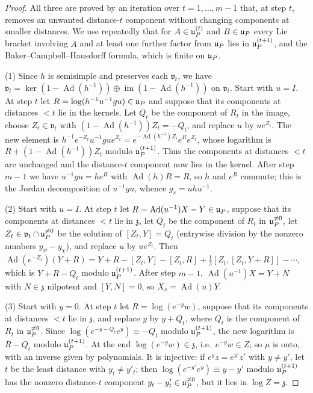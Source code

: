 \begin{proof}
All three are proved by an iteration over $t=1,\ldots,m-1$ that, at step $t$, removes an unwanted
distance-$t$ component without changing components at smaller distances. We use repeatedly that for
$A\in\mathfrak{u}_P^{(t)}$ and $B\in\mathfrak{u}_P$ every Lie bracket involving $A$ and at least one further factor
from $\mathfrak{u}_P$ lies in $\mathfrak{u}_P^{(t+1)}$, and the Baker--Campbell--Hausdorff formula, which is finite on
$\mathfrak{u}_P$.

(1) Since $h$ is semisimple and preserves each $\mathfrak v_t$, we have
$\mathfrak v_t=\ker(1-\operatorname{Ad}(h^{-1}))\oplus\operatorname{im}(1-\operatorname{Ad}(h^{-1}))$ on $\mathfrak v_t$. Start with $u=I$. At
step $t$ let $R=\log(h^{-1}u^{-1}gu)\in\mathfrak{u}_P$ and suppose that its components at distances $<t$ lie in
the kernels. Let $Q_t$ be the component of $R_t$ in the image, choose $Z_t\in\mathfrak v_t$ with
$(1-\operatorname{Ad}(h^{-1}))Z_t=-Q_t$, and replace $u$ by $ue^{Z_t}$. The new element is
$h^{-1}e^{-Z_t}u^{-1}gue^{Z_t}=e^{-\operatorname{Ad}(h^{-1})Z_t}e^{R}e^{Z_t}$, whose logarithm is
$R+(1-\operatorname{Ad}(h^{-1}))Z_t$ modulo $\mathfrak{u}_P^{(t+1)}$. Thus the components at distances $<t$ are
unchanged and the distance-$t$ component now lies in the kernel. After step $m-1$ we have
$u^{-1}gu=he^R$ with $\operatorname{Ad}(h)R=R$, so $h$ and $e^R$ commute; this is the Jordan decomposition of
$u^{-1}gu$, whence $g_s=uhu^{-1}$.

(2) Start with $u=I$. At step $t$ let $R=\operatorname{Ad}(u^{-1})X-Y\in\mathfrak{u}_P$, suppose that its components at
distances $<t$ lie in $\mathfrak z$, let $Q_t$ be the component of $R_t$ in $\mathfrak{u}_P^{\ne0}$, let
$Z_t\in\mathfrak v_t\cap\mathfrak{u}_P^{\ne0}$ be the solution of $[Z_t,Y]=Q_t$ (entrywise division by the nonzero
numbers $y_\psi-y_\chi$), and replace $u$ by $ue^{Z_t}$. Then
$\operatorname{Ad}(e^{-Z_t})(Y+R)=Y+R-[Z_t,Y]-[Z_t,R]+\tfrac12[Z_t,[Z_t,Y+R]]-\cdots$, which is
$Y+R-Q_t$ modulo $\mathfrak{u}_P^{(t+1)}$. After step $m-1$, $\operatorname{Ad}(u^{-1})X=Y+N$ with $N\in\mathfrak z$
nilpotent and $[Y,N]=0$, so $X_s=\operatorname{Ad}(u)Y$.

(3) Start with $y=0$. At step $t$ let $R=\log(e^{-y}w)$, suppose that its components at distances
$<t$ lie in $\mathfrak z$, and replace $y$ by $y+Q_t$, where $Q_t$ is the component of $R_t$ in
$\mathfrak{u}_P^{\ne0}$. Since $\log(e^{-y-Q_t}e^{y})\equiv-Q_t$ modulo $\mathfrak{u}_P^{(t+1)}$, the new logarithm is
$R-Q_t$ modulo $\mathfrak{u}_P^{(t+1)}$. At the end $\log(e^{-y}w)\in\mathfrak z$, i.e.\ $e^{-y}w\in Z$; so $\mu$
is onto, with an inverse given by polynomials. It is injective: if $e^{y}z=e^{y'}z'$ with $y\ne y'$,
let $t$ be the least distance with $y_t\ne y'_t$; then $\log(e^{-y'}e^{y})\equiv y-y'$ modulo
$\mathfrak{u}_P^{(t+1)}$ has the nonzero distance-$t$ component $y_t-y'_t\in\mathfrak{u}_P^{\ne0}$, but it lies in
$\log Z=\mathfrak z$.


\end{proof}
